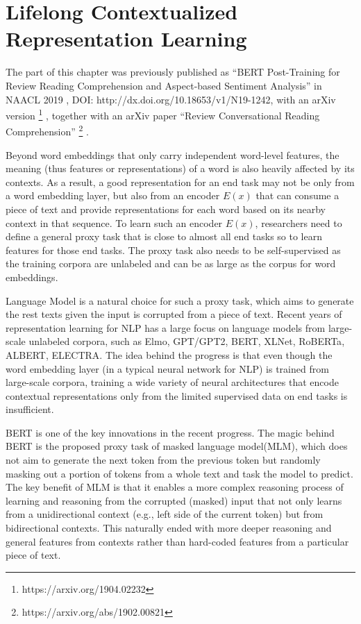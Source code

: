 \chapter{Lifelong Contextualized Representation Learning}
\label{chap4:context}

The part of this chapter was previously published as ``BERT Post-Training for Review Reading Comprehension and Aspect-based Sentiment Analysis'' in NAACL 2019 \cite{xu2019bert}, DOI: http://dx.doi.org/10.18653/v1/N19-1242, with an arXiv version \footnote{https://arxiv.org/1904.02232} \cite{xu2019bert_arxiv}, together with an arXiv paper ``Review Conversational Reading Comprehension'' \footnote{https://arxiv.org/abs/1902.00821} \cite{xu2019review}.

Beyond word embeddings that only carry independent word-level features, the meaning (thus features or representations) of a word is also heavily affected by its contexts.
As a result, a good representation for an end task may not be only from a word embedding layer, but also from an encoder $E(x)$ that can consume a piece of text and provide representations for each word based on its nearby context in that sequence.
To learn such an encoder $E(x)$, researchers need to define a general proxy task that is close to almost all end tasks so to learn features for those end tasks.
The proxy task also needs to be self-supervised as the training corpora are unlabeled and can be as large as the corpus for word embeddings.

Language Model is a natural choice for such a proxy task, which aims to generate the rest texts given the input is corrupted from a piece of text.
Recent years of representation learning for NLP has a large focus on language models from large-scale unlabeled corpora, such as Elmo\cite{peters2018deep}, GPT/GPT2\cite{radford2018improving,radford2019language}, BERT\cite{devlin2018bert}, XLNet\cite{yang2019xlnet}, RoBERTa\cite{liu2019roberta}, ALBERT\cite{lan2019albert}, ELECTRA\cite{clark2019electra}.
The idea behind the progress is that even though the word embedding \cite{mikolov2013distributed,pennington2014glove} layer (in a typical neural network for NLP) is trained from large-scale corpora, training a wide variety of neural architectures that encode contextual representations only from the limited supervised data on end tasks is insufficient.

BERT\cite{devlin2018bert} is one of the key innovations in the recent progress.
The magic behind BERT is the proposed proxy task of masked language model(MLM), which does not aim to generate the next token from the previous token but randomly masking out a portion of tokens from a whole text and task the model to predict.
The key benefit of MLM is that it enables a more complex reasoning process of learning and reasoning from the corrupted (masked) input that not only learns from a unidirectional context (e.g., left side of the current token) but from bidirectional contexts.
This naturally ended with more deeper reasoning and general features from contexts rather than hard-coded features from a particular piece of text.


